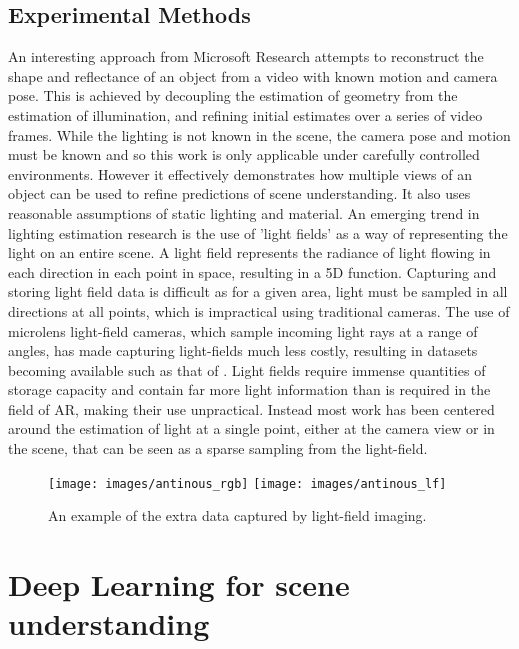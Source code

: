 \documentclass[ %
                    author={Gavin Parker},
                supervisor={Dr. Neill Campbell},
                    degree={MEng},
                     title={Deep Siamese Networks for Illumination Estimation from Stereo Images},
                  subtitle={},
                      type={Research},
                      year={2018} ]{dissertation}
\begin{document}
\subsection{Experimental Methods}
An interesting approach from Microsoft Research \cite{xia} attempts to reconstruct the shape and reflectance of an object from a video with known motion and camera pose. This is achieved by decoupling the estimation of geometry from the estimation of illumination, and refining initial estimates over a series of video frames. While the lighting is not known in the scene, the camera pose and motion must be known and so this work is only applicable under carefully controlled environments. However it effectively demonstrates how multiple views of an object can be used to refine predictions of scene understanding. It also uses reasonable assumptions of static lighting and material.
\newline
An emerging trend in lighting estimation research is the use of 'light fields' as a way of representing the light on an entire scene. A light field represents the radiance of light flowing in each direction in each point in space, resulting in a 5D function. Capturing and storing light field data is difficult as for a given area, light must be sampled in all directions at all points, which is impractical using traditional cameras. The use of microlens light-field cameras, which sample incoming light rays at a range of angles, has made capturing light-fields much less costly, resulting in datasets becoming available such as that of \cite{hazirbas17ddff}. Light fields require immense quantities of storage capacity and contain far more light information than is required in the field of AR, making their use unpractical. Instead most work has been centered around the estimation of light at a single point, either at the camera view or in the scene, that can be seen as a sparse sampling from the light-field.
\begin{figure}[H]
\texttt{[image: images/antinous\_rgb]}
\texttt{[image: images/antinous\_lf]}
\centering
\caption{An example of the extra data captured by light-field imaging.}
\end{figure}
\section{Deep Learning for scene understanding}
\end{document}
